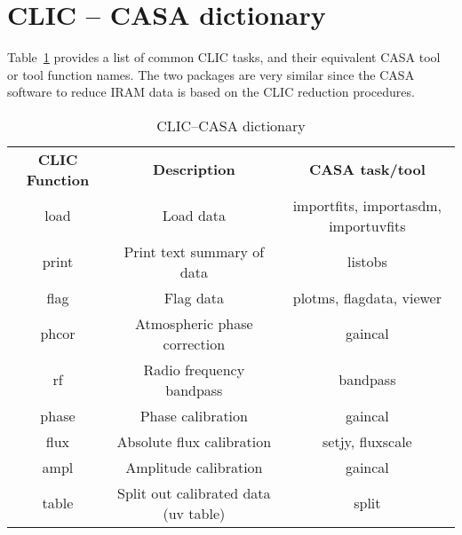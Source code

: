 
\section{CLIC -- CASA dictionary}
\label{section:dict.clic}

Table~\ref{table:clic} provides a list of common CLIC tasks, and their
equivalent CASA tool or tool function names. The two packages are
very similar since the CASA software to reduce IRAM data is based
on the CLIC reduction procedures.

\vspace{5mm}
\begin{table}[hb]
\caption[CLIC--CASA dictionary]
        {\label{table:clic} CLIC--CASA dictionary}
\begin{center}
\begin{tabular}{|c|c|c|} \hline
{\bf CLIC Function}  & {\bf Description}           &   {\bf CASA task/tool}  \\
  load              & Load data                    &  importfits,
  importasdm, importuvfits \\
  print             & Print text summary of data   &  listobs \\ 
  flag              & Flag data                    &  plotms, flagdata, viewer \\
  phcor             & Atmospheric phase correction &  gaincal \\  
  rf                & Radio frequency bandpass     &  bandpass \\
  phase             & Phase calibration            &  gaincal \\
  flux              & Absolute flux calibration    &  setjy, fluxscale \\
  ampl              & Amplitude calibration        &  gaincal \\
  table             & Split out calibrated data (uv table)  &   split \\
\hline
\end{tabular}
\end{center}
\end{table}

